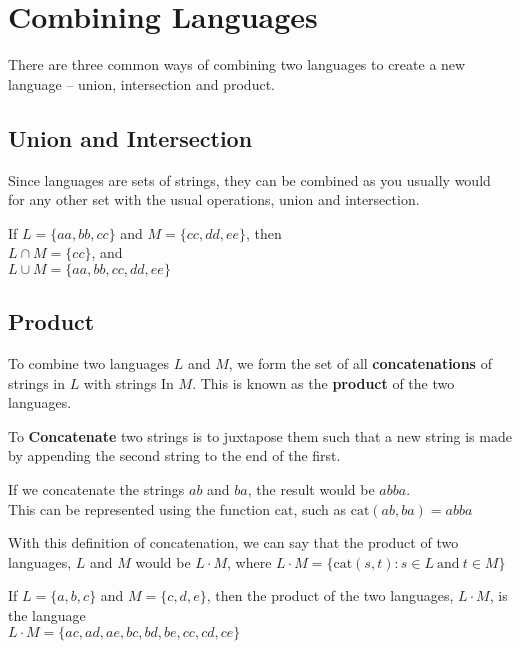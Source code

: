 \section*{Combining Languages}

There are three common ways of combining two languages to create a new language -- union, intersection and product.

\subsection*{Union and Intersection}

Since languages are sets of strings, they can be combined as you usually would for any other set with the usual operations,
 union and intersection.

\begin{example*}{}{}
  If $L = \{aa, bb, cc\}$ and $M = \{cc, dd, ee\}$, then\\
  $L \cap M = \{cc\}$, and\\
  $L \cup M = \{aa, bb, cc, dd, ee\}$
\end{example*}

\subsection*{Product}

To combine two languages $L$ and $M$, we form the set of all \textbf{concatenations} of strings in $L$ with strings In
 $M$. This is known as the \textbf{product} of the two languages.

\begin{definition*}{}{}
  To \textbf{Concatenate} two strings is to juxtapose them such that a new string is made by appending the second string
   to the end of the first.
\end{definition*}

\begin{example*}{}{}
  If we concatenate the strings $ab$ and $ba$, the result would be $abba$.\\
  This can be represented using the function $\mathrm{cat}$, such as $\mathrm{cat}(ab, ba) = abba$
\end{example*}

With this definition of concatenation, we can say that the product of two languages, $L$ and $M$ would be $L \cdot M$,
 where $L \cdot M = \{\mathrm{cat}(s, t) : s \in L\ \mathrm{and}\ t \in M\}$

\begin{example*}{}{}
  If $L = \{a, b, c\}$ and $M = \{c, d, e\}$, then the product of the two languages, $L \cdot M$, is the language\\
  $L \cdot M = \{ac, ad, ae, bc, bd, be, cc, cd, ce\}$
\end{example*}

